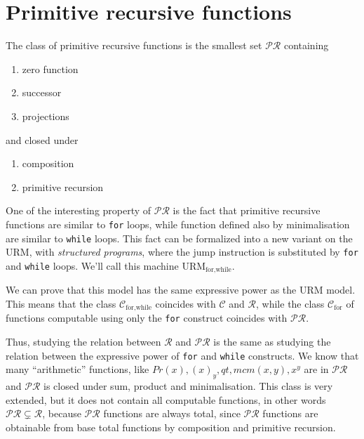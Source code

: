 \chapter{Primitive recursive functions}
\begin{definition}
  The class of
primitive recursive functions is the smallest set
$\mathcal{PR}$ containing
\begin{enumerate}[label=(\alph*)]
\item zero function
\item successor
\item projections
\end{enumerate}
and closed under
\begin{enumerate}[label=(\arabic*)]
\item composition
\item primitive recursion
\end{enumerate}
\end{definition}

One of the interesting property of $\mathcal{PR}$ is the
fact that primitive recursive functions are similar to \texttt{for} loops, while
function defined also by minimalisation are similar to \texttt{while} loops. This fact can be
formalized into a new variant on the URM, with \emph{structured
  programs}, where the jump instruction is substituted by
\texttt{for} and \texttt{while} loops. We'll call this machine
$\text{URM}_{\text{for,while}}$.

We can prove that this model has the same expressive power as the
URM model. This means that the class $\mathcal{C}_{\text{for,while}}$
coincides with $\mathcal{C}$ and $\mathcal{R}$,
while the class $\mathcal{C}_{\text{for}}$ of functions computable using only the \texttt{for}
construct coincides with $\mathcal{PR}$.

Thus, studying the relation between $\mathcal{R}$ and $\mathcal{PR}$ is
the same as studying the relation between the expressive power of
\texttt{for} and \texttt{while} constructs.  We know that many
``arithmetic'' functions, like $Pr(x), (x)_y, qt, mcm(x,y),
x^y$ are in $\mathcal{PR}$ and $\mathcal{PR}$ is closed under sum,
product and minimalisation. This class is very
extended, but it does not contain all computable functions, in other
words $\mathcal{PR} \subsetneq \mathcal{R}$, because $\mathcal{PR}$
functions are always total, since
$\mathcal{PR}$ functions are obtainable from base total functions by
composition and primitive recursion.

